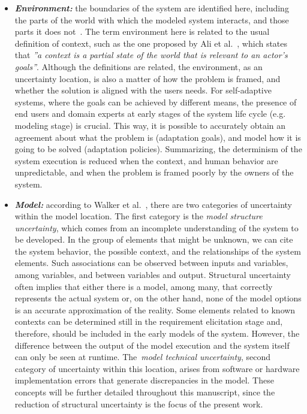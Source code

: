 \begin{itemize}
\item \textit{\textbf{Environment:}} the boundaries of the system are identified here, including the parts of the world with which the modeled system interacts, and those parts it does not~\cite{walker2003defining}. The term environment here is related to the usual definition of context, such as the one proposed by Ali et al.~\cite{Ali}, which states that \textit{''a context is a partial state of the world that is relevant to an actor’s goals''}. Although the definitions are related, the environment, as an uncertainty location, is also a matter of how the problem is framed, and whether the solution is aligned with the users needs. For self-adaptive systems, where the goals can be achieved by different means, the presence of end users and domain experts at early stages of the system life cycle (e.g. modeling stage) is crucial. This way, it is possible to accurately obtain an agreement about what the problem is (adaptation goals), and model how it is going to be solved (adaptation policies). Summarizing, the determinism of the system execution is reduced when the context, and human behavior are unpredictable, and when the problem is framed poorly by the owners of the system.

\item \textbf{\textit{Model:}} according to Walker et al.~\cite{walker2003defining}, there are two categories of uncertainty within the model location. The first category is the \textit{model structure uncertainty}, which comes from an incomplete understanding of the system to be developed. In the group of elements that might be unknown, we can cite the system behavior, the possible context, and the relationships of the system elements. Such associations can be observed between inputs and variables, among variables, and between variables and output. Structural uncertainty often implies that either there is a model, among many, that correctly represents the actual system or, on the other hand, none of the model options is an accurate approximation of the reality. Some elements related to known contexts can be determined still in the requirement elicitation stage and, therefore, should be included in the early models of the system. However, the difference between the output of the model execution and the system itself can only be seen at runtime. The~\textit{model technical uncertainty}, second category of uncertainty within this location, arises from software or hardware implementation errors that generate discrepancies in the model. These concepts will be further detailed throughout this manuscript, since the reduction of structural uncertainty is the focus of the present work.


\end{itemize}

